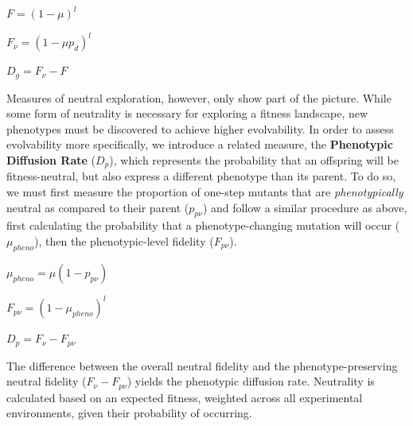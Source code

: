 \documentclass[letterpaper]{article}
\begin{document}
\begin{center}
$F = (1 - \mu)^l$

$F_\nu = (1 - \mu p_d)^l$

$D_g = F_\nu - F$
\end{center}

Measures of neutral exploration, however, only show part of the picture. While some form of neutrality is necessary for exploring a fitness landscape, new phenotypes must be discovered to achieve higher evolvability.
In order to assess evolvability more specifically, we introduce a related measure, the \textbf{Phenotypic Diffusion Rate} ($D_p$), which represents the probability that an offspring will be fitness-neutral, but also express a different phenotype than its parent. To do so, we must first measure the proportion of one-step mutants that are \textit{phenotypically} neutral as compared to their parent ($p_{p\nu}$) and follow a similar procedure as above, first calculating the probability that a phenotype-changing mutation will occur ($\mu_{pheno}$), then the phenotypic-level fidelity ($F_{p\nu}$).  
\begin{center}
$\mu_{pheno} = \mu (1- p_{p\nu})$

$F_{p\nu} = (1 - \mu_{pheno})^l$

$D_p = F_\nu - F_{p\nu}$
\end{center}
The difference between the overall neutral fidelity and the phenotype-preserving neutral fidelity ($F_\nu - F_{p\nu}$) yields the phenotypic diffusion rate.
Neutrality is calculated based on an expected fitness, weighted across all experimental environments, given their probability of occurring.
% 
% 
\end{document}
